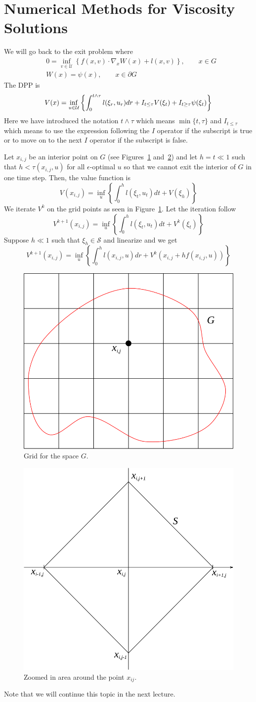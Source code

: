 \section{Numerical Methods for Viscosity Solutions}
We will go back to the exit problem where
\begin{align*}
&0 = \inf_{v\in\mathcal{U}}\left\lbrace f(x,v)\cdot\nabla_x W(x)+l(x,v)\right\rbrace, \qquad x\in G \\
&W(x) = \psi(x), \qquad x\in\partial G
\end{align*}
The DPP is
$$V(x) = \inf_{u\in\mathcal{U}}\left\lbrace \int_0^{t\wedge\tau}l(\xi_r,u_r)dr + I_{t\leq\tau}V(\xi_t) + I_{t\geq\tau}\psi(\xi_t)\right\rbrace$$
Here we have introduced the notation $t\wedge\tau$ which means $\min\{t,\tau\}$ and $I_{t\leq\tau}$ which means to use the expression following the $I$ operator if the subscript is true or to move on to the next $I$ operator if the subscript is false.

Let $x_{i,j}$ be an interior point on $G$ (see Figures~\ref{fig:16grid} and~\ref{fig:16x}) and let $h=t\ll 1$ such that $h<\tau(x_{i,j},u)$ for all $\epsilon$-optimal $u$ so that we cannot exit the interior of $G$ in one time step.
Then, the value function is
$$V(x_{i,j}) = \inf_u\left\lbrace \int_0^h l(\xi_t,u_t)dt+V(\xi_h)\right\rbrace$$
We iterate $V^k$ on the grid points as seen in Figure~\ref{fig:16grid}.
Let the iteration follow
$$V^{k+1}(x_{i,j}) = \inf_u\left\lbrace \int_0^h l(\xi_t,u_t)dt + V^k(\xi_t)\right\rbrace$$
Suppose $h\ll 1$ such that $\xi_h\in\mathcal{S}$ and linearize and we get
$$V^{k+1}(x_{i,j}) = \inf_u\left\lbrace \int_0^h l(x_{i,j},u)dr+V^k(x_{i,j}+hf(x_{i,j},u))\right\rbrace$$

\begin{figure}[ht!]
\centering
\includegraphics[width=.4\textwidth]{images/16grid}
\caption{Grid for the space $G$.}
\label{fig:16grid}
\end{figure}

\begin{figure}[ht!]
\centering
\includegraphics[width=.4\textwidth]{images/16x}
\caption{Zoomed in area around the point $x_{ij}$.}
\label{fig:16x}
\end{figure}

Note that we will continue this topic in the next lecture.%
